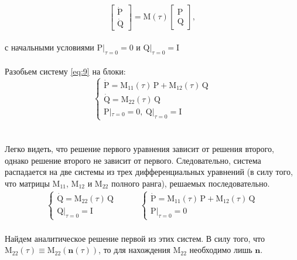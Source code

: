 \documentclass{article}
\newcommand{\bfv}[1]{\mathbf{#1}}
\newcommand{\dd}[1]{\dot{#1}}
\newcommand{\matr}[1]{\mathrm{#1}}
\begin{document}
\begin{equation} \label{eq:9}
\begin{bmatrix}
    \dd{\matr{P}}\\
    \dd{\matr{Q}}
\end{bmatrix} = \matr{M}(\tau) 
\begin{bmatrix}
    \matr{P}\\
    \matr{Q}
\end{bmatrix},
\end{equation}\\
с начальными условиями $\matr{P}|_{\tau=0} = \matr{0}$ и $\matr{Q}|_{\tau=0} = \matr{I}$\\\\
Разобьем систему \eqref{eq:9} на блоки:
\begin{equation} \label{eq:10}
\begin{cases}
\dd{\matr{P}} = \matr{M}_{11}(\tau)\,\matr{P} + \matr{M}_{12}(\tau)\,\matr{Q}\\
\dd{\matr{Q}} = \matr{M}_{22}(\tau)\,\matr{Q}\\
\matr{P}|_{\tau=0} = \matr{0}, \ \matr{Q}|_{\tau=0} = \matr{I}
\end{cases}
\end{equation}\\\\
Легко видеть, что решение первого уравнения зависит от решения второго, однако решение второго не зависит от первого. Следовательно, система распадается на две системы из трех дифференциальных уравнений (в силу того, что матрицы $\matr{M}_{11}$, $\matr{M}_{12}$ и $\matr{M}_{22}$ полного ранга), решаемых последовательно.\\
\begin{align*}
\begin{cases}
\dd{\matr{Q}} = \matr{M}_{22}(\tau)\,\matr{Q}\\
\matr{Q}|_{\tau=0} = \matr{I}
\end{cases}   
\quad & \quad   
\begin{cases}
\dd{\matr{P}} = \matr{M}_{11}(\tau)\,\matr{P} + \matr{M}_{12}(\tau)\,\matr{Q}\\
\matr{P}|_{\tau=0} = \matr{0}
\end{cases} 
\end{align*}\\
Найдем аналитическое решение первой из этих систем. В силу того, что $\matr{M}_{22}(\tau) \equiv \matr{M}_{22}(\bfv{n}(\tau))$, то для нахождения $\matr{M}_{22}$ необходимо лишь $\bfv{n}$.\\\\
\end{document}
